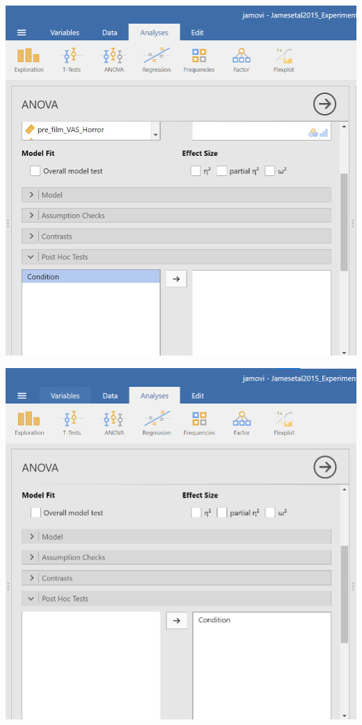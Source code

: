 \documentclass[
]{book}
\begin{document}
\includegraphics{img/ANOVAPostHocCommands.png}

\includegraphics{img/ANOVAPostHocCommands2.png}
\end{document}
